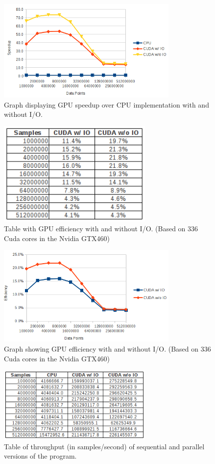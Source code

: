 \documentclass[conference]{IEEEtran}
\begin{document}
\begin{figure}[ht!]
\centering
\includegraphics[width=3.5in]{speedupgraph.png}
\caption{Graph displaying GPU speedup over CPU implementation with and without I/O.}
\label{fig:speedupgraph}
\end{figure}

\begin{figure}[ht!]
\centering
\includegraphics[width=3in]{efficiency.png}
\caption{Table with GPU efficiency with and without I/O. (Based on 336 Cuda cores in the Nvidia GTX460)}
\label{fig:efficiency}
\end{figure}

\begin{figure}[ht!]
\centering
\includegraphics[width=3.5in]{efficiencygraph.png}
\caption{Graph showing GPU efficiency with and without I/O. (Based on 336 Cuda cores in the Nvidia GTX460)}
\label{fig:efficiencygraph}
\end{figure}

\begin{figure}[ht!]
\centering
\includegraphics[width=3in]{throughput.png}
\caption{Table of throughput (in samples/second) of sequential and parallel versions of the program. }
\label{fig:throughput}
\end{figure}
\end{document}
